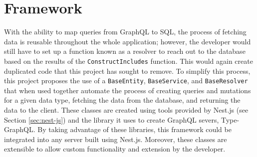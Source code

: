 \section{Framework}
With the ability to map queries from GraphQL to SQL, the process of fetching data is reusable throughout the whole application; however, the developer would still have to set up a function known as a resolver to reach out to the database based on the results of the \verb!ConstructIncludes! function.  This would again create duplicated code that this project has sought to remove.  To simplify this process, this project proposes the use of a \verb!BaseEntity!, \verb!BaseService!, and \verb!BaseResolver! that when used together automate the process of creating queries and mutations for a given data type, fetching the data from the database, and returning the data to the client.  These classes are created using tools provided by Nest.js (see Section \ref{sec:nest-js}) and the library it uses to create GraphQL severs, Type-GraphQL.  By taking advantage of these libraries, this framework could be integrated into any server built using Nest.js.  Moreover, these classes are extensible to allow custom functionality and extension by the developer.









